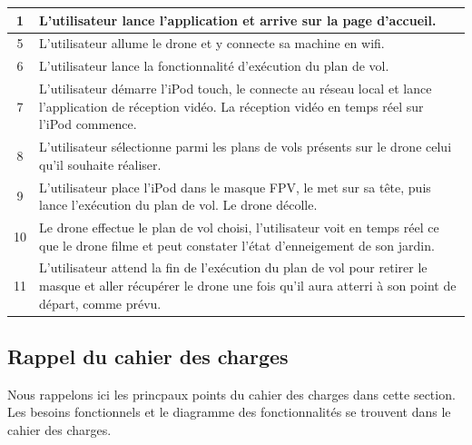 \documentclass{article}
\begin{document}
	    \vspace{0.7cm}	     
	    \begin{center}
	    \renewcommand{\arraystretch}{2}
        \begin{tabularx}{15cm}{|c|X|}
            \hline
            1 & L'utilisateur lance l'application et arrive sur la page d'accueil.\\
            \hline
            5 & L'utilisateur allume le drone et y connecte sa machine en wifi. \\
            \hline
            6 & L'utilisateur lance la fonctionnalité d'exécution du plan de vol. \\
            \hline
            7 &  L'utilisateur démarre l'iPod touch, le connecte au réseau local et lance l'application de réception vidéo. La réception vidéo en temps réel sur l'iPod commence.\\
            \hline
            8 & L'utilisateur sélectionne parmi les plans de vols présents sur le drone celui qu'il souhaite réaliser. \\
            \hline
            9 & L'utilisateur place l'iPod dans le masque FPV, le met sur sa tête, puis lance l'exécution du plan de vol. Le drone décolle. \\
            \hline
            10 & Le drone effectue le plan de vol choisi, l'utilisateur voit en temps réel ce que le drone filme et peut constater l'état d'enneigement de son jardin. \\
            \hline
            11 & L'utilisateur attend la fin de l'exécution du plan de vol pour retirer le masque et aller récupérer le drone une fois qu'il aura atterri à son point de départ, comme prévu.\\
            \hline 
\end{tabularx}
        \end{center}
	    
	    
	\newpage
	\subsection{Rappel du cahier des charges}
    Nous rappelons ici les princpaux points du cahier des charges dans cette section.
    Les besoins fonctionnels et le diagramme des fonctionnalités se trouvent dans le cahier des charges.
    
\end{document}
